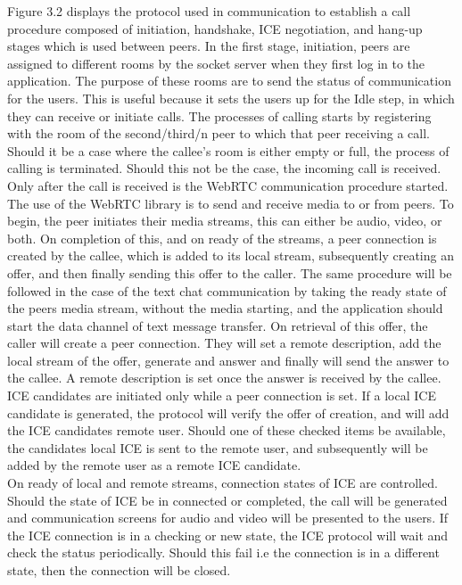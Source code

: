 Figure 3.2 displays the protocol used in communication to establish a call procedure composed of initiation, handshake, ICE negotiation, and hang-up stages which is used between peers.
In the first stage, initiation, peers are assigned to different rooms by the socket server when they first log in to the application. The purpose of these rooms are to send the status of communication for the users. This is useful because it sets the users up for the Idle step, in which they can receive or initiate calls. The processes of calling starts by registering with the room of the second/third/n peer to which that peer receiving a call. Should it be a case where the callee’s room is either empty or full, the process of calling is terminated. Should this not be the case, the incoming call is received. Only after the call is received is the WebRTC communication procedure started. 
\\The use of the WebRTC library is to send and receive media to or from peers. To begin, the peer initiates their media streams, this can either be audio, video, or both. On completion of this, and on ready of the streams, a peer connection is created by the callee, which is added to its local stream, subsequently creating an offer, and then finally sending this offer to the caller. The same procedure will be followed in the case of the text chat communication by taking the ready state of the peers media stream, without the media starting, and the application should start the data channel of text message transfer. On retrieval of this offer, the caller will create a peer connection. They will set a remote description, add the local stream of the offer, generate and answer and finally will send the answer to the callee. A remote description is set once the answer is received by the callee. ICE candidates are initiated only while a peer connection is set. If a local ICE candidate is generated, the protocol will verify the offer of creation, and will add the ICE candidates remote user. Should one of these checked items be available, the candidates local ICE is sent to the remote user, and subsequently will be added by the remote user as a remote ICE candidate.
\\On ready of local and remote streams, connection states of ICE are controlled. Should the state of ICE be in connected or completed, the call will be generated  and communication screens for audio and video will be presented to the users. If the ICE connection is in a checking or new state, the ICE protocol will wait and check the status periodically. Should this fail i.e the connection is in a different state, then the connection will be closed.
